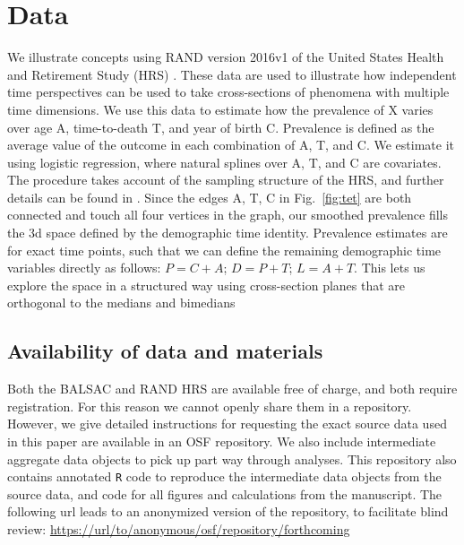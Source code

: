 \documentclass{bmcart}
\begin{document}
\section*{Data}
We illustrate concepts using RAND version 2016v1 of the United States Health and Retirement Study (HRS) \citep{HRS, RAND}. These data are used to illustrate how independent time perspectives can be used to take cross-sections of phenomena with multiple time dimensions. We use this data to estimate how the prevalence of X varies over age A, time-to-death T, and year of birth C. Prevalence is defined as the average value of the outcome in each combination of A, T, and C. We estimate it using logistic regression, where natural splines over A, T, and C are covariates. The procedure takes account of the sampling structure of the HRS, and further details can be found in \citet{riffe2017hle}. Since the edges A, T, C in Fig.~\ref{fig:tet} are both connected and touch all four vertices in the graph, our smoothed prevalence fills the 3d space defined by the demographic time identity. Prevalence estimates are for exact time points, such that we can define the remaining demographic time variables directly as follows: $P = C + A$; $D = P + T$; $L = A + T$. This lets us explore the space in a structured way using cross-section planes that are orthogonal to the medians and bimedians 

\subsection*{Availability of data and materials}
Both the BALSAC and RAND HRS are available free of charge, and both require registration. For this reason we cannot openly share them in a repository. However, we give detailed instructions for requesting the exact source data used in this paper are available in an OSF repository. We also include intermediate aggregate data objects to pick up part way through analyses. This repository also contains annotated \texttt{R} code to reproduce the intermediate data objects from the source data, and code for all figures and calculations from the manuscript.
The following url leads to an anonymized version of the repository, to facilitate blind review:
\url{https://url/to/anonymous/osf/repository/forthcoming}


\end{document}
